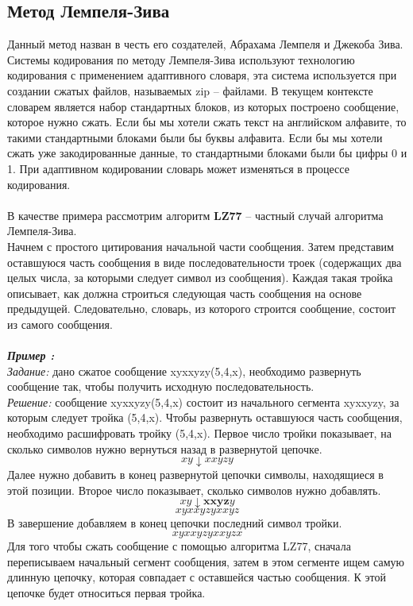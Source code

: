 \subsection{Метод Лемпеля-Зива}
Данный метод назван в честь его создателей, Абрахама Лемпеля и Джекоба Зива. Системы кодирования по методу Лемпеля-Зива используют технологию кодирования с применением адаптивного словаря, эта система используется при создании сжатых файлов, называемых zip – файлами. В текущем контексте словарем является набор стандартных блоков,  из которых построено сообщение, которое нужно сжать. Если бы мы хотели сжать текст на английском алфавите, то такими стандартными блоками были бы буквы алфавита. Если бы мы хотели сжать уже закодированные данные, то стандартными блоками были бы цифры 0 и 1. При адаптивном кодировании словарь может изменяться в процессе кодирования.\\
\\В качестве примера рассмотрим алгоритм \textbf{LZ77} – частный случай алгоритма Лемпеля-Зива.\\
Начнем с простого цитирования начальной части сообщения. Затем представим оставшуюся часть сообщения в виде последовательности троек (содержащих два целых числа, за которыми следует символ из сообщения). Каждая такая тройка описывает, как должна строиться следующая часть сообщения на основе предыдущей. Следовательно, словарь, из которого строится сообщение, состоит из самого сообщения.\\
\\\emph{\textbf{Пример :}}
\\\emph{Задание:} дано сжатое сообщение xyxxyzy(5,4,x), необходимо развернуть сообщение так, чтобы получить исходную последовательность.
\\\emph{Решение:} сообщение xyxxyzy(5,4,x) состоит из начального сегмента xyxxyzy, за которым следует тройка (5,4,x).
Чтобы развернуть оставшуюся часть сообщения, необходимо расшифровать тройку (5,4,x). Первое число тройки показывает, на сколько символов нужно вернуться назад в развернутой цепочке.
$$xy\downarrow xxyzy$$
 Далее нужно добавить в конец развернутой цепочки символы, находящиеся в этой позиции. Второе число показывает, сколько символов нужно добавлять.
$$xy\downarrow \textbf{xxyz}y$$
$$xyxxyzyxxyz$$
В завершение добавляем в конец цепочки последний символ тройки.
$$xyxxyzyxxyzx$$
Для того чтобы сжать сообщение с помощью алгоритма LZ77, сначала переписываем начальный сегмент сообщения, затем в этом сегменте ищем самую длинную цепочку, которая совпадает с оставшейся частью сообщения. К этой цепочке будет относиться первая тройка. 
